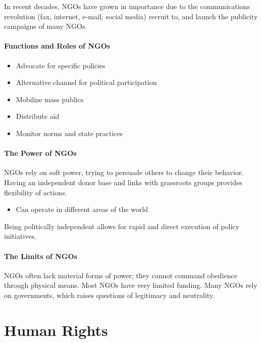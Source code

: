 \documentclass[
]{book}
\providecommand{\tightlist}{%
  \setlength{\itemsep}{0pt}\setlength{\parskip}{0pt}}
\begin{document}
In recent decades, NGOs have grown in importance due to the communications revolution (fax, internet, e-mail, social media) recruit to, and launch the publicity campaigns of many NGOs.

\hypertarget{functions-and-roles-of-ngos}{%
\subsubsection{Functions and Roles of NGOs}\label{functions-and-roles-of-ngos}}

\begin{itemize}
\item
  Advocate for specific policies
\item
  Alternative channel for political participation
\item
  Mobilize mass publics
\item
  Distribute aid
\item
  Monitor norms and state practices
\end{itemize}

\hypertarget{the-power-of-ngos}{%
\subsubsection{The Power of NGOs}\label{the-power-of-ngos}}

NGOs rely on soft power, trying to persuade others to change their behavior. Having an independent donor base and links with grassroots groups provides flexibility of actions.

\begin{itemize}
\tightlist
\item
  Can operate in different areas of the world
\end{itemize}

Being politically independent allows for rapid and direct execution of policy initiatives.

\hypertarget{the-limits-of-ngos}{%
\subsubsection{The Limits of NGOs}\label{the-limits-of-ngos}}

NGOs often lack material forms of power; they cannot command obedience through physical means. Most NGOs have very limited funding. Many NGOs rely on governments, which raises questions of legitimacy and neutrality.

\hypertarget{human-rights}{%
\chapter{Human Rights}\label{human-rights}}
\end{document}
